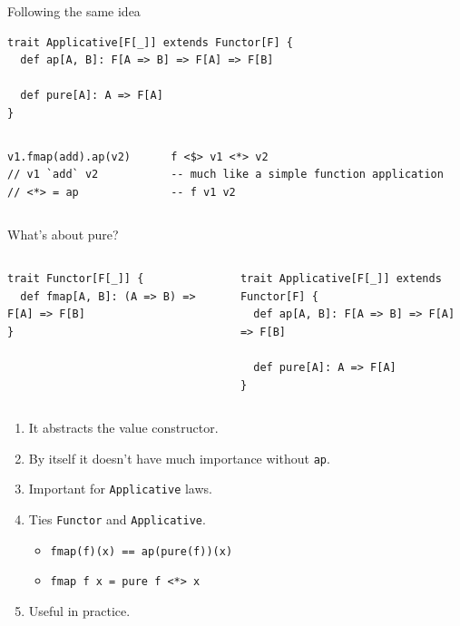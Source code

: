 \documentclass[presentation,aspectratio=169,smaller]{beamer}
\begin{document}
\begin{frame}[label={sec:org21b7019},fragile]{Following the same idea}
 \begin{verbatim}
trait Applicative[F[_]] extends Functor[F] {
  def ap[A, B]: F[A => B] => F[A] => F[B]

  def pure[A]: A => F[A]
}
\end{verbatim}

\pause

\begin{columns}
\begin{column}[t]{0.46\columnwidth}
\begin{verbatim}
v1.fmap(add).ap(v2)
// v1 `add` v2
// <*> = ap
\end{verbatim}

\pause
\end{column}

\begin{column}[t]{0.46\columnwidth}
\begin{verbatim}
f <$> v1 <*> v2
-- much like a simple function application
-- f v1 v2
\end{verbatim}
\end{column}
\end{columns}
\end{frame}

\begin{frame}[label={sec:org6175b9f},fragile]{What's about pure?}
 \begin{columns}
\begin{column}[t]{0.4\columnwidth}
\begin{verbatim}
trait Functor[F[_]] {
  def fmap[A, B]: (A => B) => F[A] => F[B]
}
\end{verbatim}
\end{column}

\begin{column}[t]{0.4\columnwidth}
\begin{verbatim}
trait Applicative[F[_]] extends Functor[F] {
  def ap[A, B]: F[A => B] => F[A] => F[B]

  def pure[A]: A => F[A]
}
\end{verbatim}
\end{column}
\end{columns}

\begin{enumerate}
\item <1-> It abstracts the value constructor.
\item <2-> By itself it doesn't have much importance without \texttt{ap}.
\item <3-> Important for \texttt{Applicative} laws.
\item <4-> Ties \texttt{Functor} and \texttt{Applicative}.
\begin{itemize}
\item \texttt{fmap(f)(x) == ap(pure(f))(x)}
\item \texttt{fmap f x = pure f <*> x}
\end{itemize}
\item <5-> Useful in practice.
\end{enumerate}
\end{frame}
\end{document}
